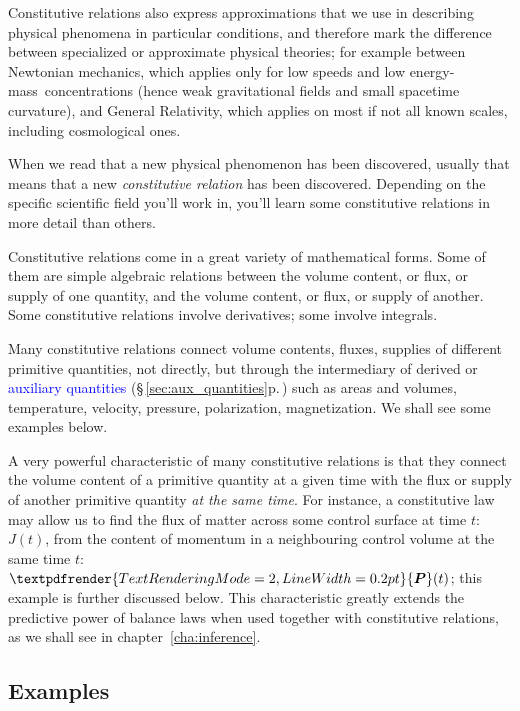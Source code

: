\documentclass[a4paper,12pt,%
onecolumn,oneside,%
british%
]{memoir}
\renewcommand*{\bm}[1]{\textpdfrender{TextRenderingMode=2,LineWidth=0.2pt}{\boldsymbol{#1}}}
\renewcommand*{\|}[1][]{\nonscript\:#1\vert\nonscript\:\mathopen{}}
\newcommand*{\sect}{\S}%
\newcommand*{\chap}{chapter}%
\renewcommand*{\autoref}[3][\sect\,\ref]{\textcolor{blue}{#3} {\color{blue}\scriptsize(\faIcon[regular]{eye}\;#1{#2}\;p.\,\pageref{#2})}}
\newcommand*{\energym}{energy-mass}
\newcommand*{\yJ}{J}
\newcommand*{\yP}{\bm{P}}
\begin{document}
Constitutive relations also express approximations that we use in describing physical phenomena in particular conditions, and therefore mark the difference between specialized or approximate physical theories; for example between Newtonian mechanics, which applies only for low speeds and low \energym\ concentrations (hence weak gravitational fields and small spacetime curvature), and General Relativity, which applies on most if not all known scales, including cosmological ones.

When we read that a new physical phenomenon has been discovered, usually that means that a new \emph{constitutive relation} has been discovered. Depending on the specific scientific field you'll work in, you'll learn some constitutive relations in more detail than others.

\medskip

Constitutive relations come in a great variety of mathematical forms. Some of them are simple algebraic relations between the volume content, or flux, or supply of one quantity, and the volume content, or flux, or supply of another. Some constitutive relations involve derivatives; some involve integrals.

Many constitutive relations connect volume contents, fluxes, supplies of different primitive quantities, not directly, but through the intermediary of derived or \autoref{sec:aux_quantities}{auxiliary quantities} such as areas and volumes, temperature, velocity, pressure, polarization, magnetization. We shall see some examples below.

\medskip

A very powerful characteristic of many constitutive relations is that they connect the volume content of a primitive quantity at a given time with the flux or supply of another primitive quantity \emph{at the same time}. For instance, a constitutive law may allow us to find the flux of matter across some control surface at time $t$: $\yJ(t)$, from the content of momentum in a neighbouring control volume at the same time $t$: $\yP(t)$; this example is further discussed below. This characteristic greatly extends the predictive power of balance laws when used together with constitutive relations, as we shall see in \chap~\ref{cha:inference}.



\subsection{Examples}
\label{sec:example_constitutive}
\end{document}
